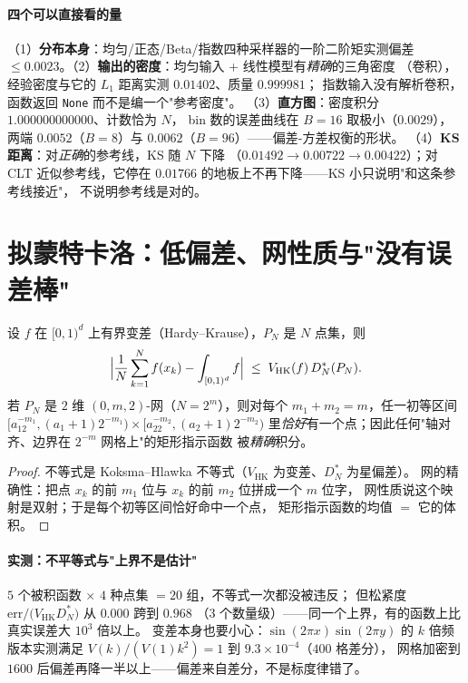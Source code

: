 \paragraph{四个可以直接看的量}
（1）\textbf{分布本身}：均匀/正态/Beta/指数四种采样器的一阶二阶矩实测偏差
$\le0.0023$。（2）\textbf{输出的密度}：均匀输入 + 线性模型有\emph{精确}的三角密度
（卷积），经验密度与它的 $L_1$ 距离实测 $0.01402$、质量 $0.999981$；
指数输入没有解析卷积，函数返回 \texttt{None} 而不是编一个"参考密度"。
（3）\textbf{直方图}：密度积分 $1.000000000000$、计数恰为 $N$，
bin 数的误差曲线在 $B=16$ 取极小（$0.0029$），两端 $0.0052$（$B=8$）与
$0.0062$（$B=96$）——偏差-方差权衡的形状。
（4）\textbf{KS 距离}：对\emph{正确}的参考线，KS 随 $N$ 下降
（$0.01492\to0.00722\to0.00422$）；对 CLT 近似参考线，它停在
$0.01766$ 的地板上不再下降——KS 小只说明"和这条参考线接近"，
不说明参考线是对的。

\section{拟蒙特卡洛：低偏差、网性质与"没有误差棒"}\label{sec:qmc}

\begin{theorem}\label{thm:qmc}
设 $f$ 在 $[0,1)^d$ 上有界变差（Hardy--Krause），$P_N$ 是 $N$ 点集，则
\[
  \Bigl\lvert \frac1N\sum_{k=1}^N f(x_k)-\int_{[0,1)^d}f\Bigr\rvert
  \;\le\; V_{\mathrm{HK}}(f)\,D_N^\ast(P_N).
\]
若 $P_N$ 是 $2$ 维 $(0,m,2)$-网（$N=2^m$），则对每个
$m_1+m_2=m$，任一初等区间
$[a_12^{-m_1},(a_1+1)2^{-m_1})\times[a_22^{-m_2},(a_2+1)2^{-m_2})$
里\emph{恰好}有一个点；因此任何"轴对齐、边界在 $2^{-m}$ 网格上"的矩形指示函数
被\emph{精确}积分。
\end{theorem}

\begin{proof}
不等式是 Koksma--Hlawka 不等式（$V_{\mathrm{HK}}$ 为变差、$D_N^\ast$ 为星偏差）。
网的精确性：把点 $x_k$ 的前 $m_1$ 位与 $x_k$ 的前 $m_2$ 位拼成一个 $m$ 位字，
网性质说这个映射是双射；于是每个初等区间恰好命中一个点，
矩形指示函数的均值 $=$ 它的体积。
\end{proof}

\paragraph{实测：不平等式与"上界不是估计"}
$5$ 个被积函数 $\times$ $4$ 种点集 $=20$ 组，不等式一次都没被违反；
但松紧度 $\text{err}/\bigl(V_{\mathrm{HK}}D_N^\ast\bigr)$ 从 $0.000$ 跨到 $0.968$
（$3$ 个数量级）——同一个上界，有的函数上比真实误差大 $10^3$ 倍以上。
变差本身也要小心：$\sin(2\pi x)\sin(2\pi y)$ 的 $k$ 倍频版本实测满足
$V(k)/(V(1)k^2)=1$ 到 $9.3\times10^{-4}$（$400$ 格差分），
网格加密到 $1600$ 后偏差再降一半以上——偏差来自差分，不是标度律错了。

